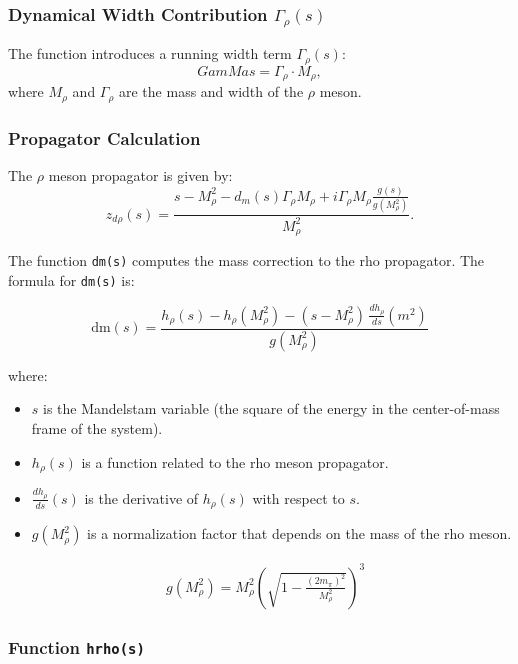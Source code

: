 \documentclass[12pt]{article}
\begin{document}
\begin{itemize}
\subsubsection{Dynamical Width Contribution \( \Gamma_{\rho}(s) \)}

The function introduces a running width term $\Gamma_{\rho}(s)$:
\begin{equation}
GamMas = \Gamma_{\rho} \cdot M_{\rho},
\end{equation}
where $M_{\rho}$ and $\Gamma_{\rho}$ are the mass and width of the $\rho$ meson.

\subsubsection{Propagator Calculation}

The $\rho$ meson propagator is given by:
\begin{equation}
z_{d\rho}(s) = \frac{s - M_{\rho}^2 - d_m(s) \Gamma_{\rho} M_{\rho} + i \Gamma_{\rho} M_{\rho} \frac{g(s)}{g(M_{\rho}^2)}}{M_{\rho}^2}.
\end{equation}

The function \texttt{dm(s)} computes the mass correction to the rho propagator. The formula for \texttt{dm(s)} is:

\[
\text{dm}(s) = \frac{h_\rho(s) - h_\rho(M_\rho^2) - (s - M_\rho^2) \, \frac{d h_\rho}{d s}(m^2)}{g(M_\rho^2)}
\]

where:
\begin{itemize}
    \item \( s \) is the Mandelstam variable (the square of the energy in the center-of-mass frame of the system).
    \item \( h_\rho(s) \) is a function related to the rho meson propagator.
    \item \( \frac{d h_\rho}{d s}(s) \) is the derivative of \( h_\rho(s) \) with respect to \( s \).
    \item \( g(M_\rho^2) \) is a normalization factor that depends on the mass of the rho meson.
\end{itemize}

\begin{align*}
& g(M_\rho^2) = M_\rho^2 \left( \sqrt{1 - \frac{(2 m_{\pi})^2}{M_\rho^2}} \right)^3
\end{align*}

\subsubsection*{Function \texttt{hrho(s)}}


\end{itemize}
\end{document}
